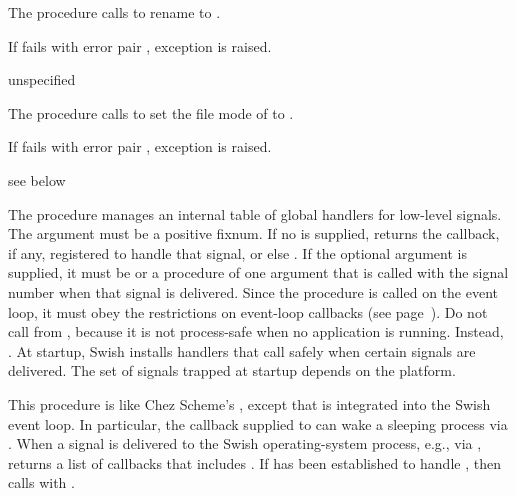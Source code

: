 The  procedure calls  to rename
 to .

If  fails with error pair , exception  is raised.

\begin{procedure}
\end{procedure}
\returns{} unspecified

The  procedure calls  to set the
file mode of  to .

If  fails with error pair , exception  is raised.

\begin{procedure}
\end{procedure}
\returns{} see below

The  procedure manages an internal table of
global handlers for low-level signals.
The  argument must be a positive fixnum.
If no  is supplied,  returns the
callback, if any, registered to handle that signal, or else .
If the optional  argument is supplied, it must be  or
a procedure of one argument that is called with the signal number when
that signal is delivered.
Since the  procedure is called on the event loop, it must obey
the restrictions on event-loop callbacks (see page~\pageref{page:event-loop}).
Do not call  from , because it is not
process-safe when no application is running.
Instead, .
At startup, Swish installs handlers that call 
safely when certain signals are delivered.
The set of signals trapped at startup depends on the platform.

This procedure is like Chez Scheme's , except
that  is integrated into the Swish event loop.
In particular, the callback supplied to  can wake a
sleeping process via .
When a signal  is delivered to the Swish operating-system process,
e.g., via ,  returns a list of
callbacks that includes .
If  has been established to handle ,
then  calls  with .

